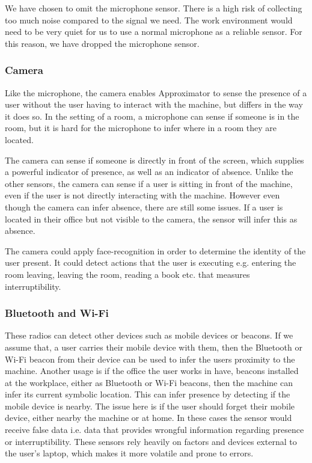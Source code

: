 \documentclass{sigchi}
\begin{document}
We have chosen to omit the microphone sensor.
There is a high risk of collecting too much noise compared to the signal we need.
The work environment would need to be very quiet for us to use a normal microphone as a reliable sensor.
For this reason, we have dropped the microphone sensor.

\subsubsection{Camera}
Like the microphone, the camera enables Approximator to sense the presence of a user without the user having to interact with the machine, but differs in the way it does so.
In the setting of a room, a microphone can sense if someone is in the room, but it is hard for the microphone to infer where in a room they are located.

The camera can sense if someone is directly in front of the screen, which supplies a powerful indicator of presence, as well as an indicator of absence.
Unlike the other sensors, the camera can sense if a user is sitting in front of the machine, even if the user is not directly interacting with the machine.
However even though the camera can infer absence, there are still some issues.
If a user is located in their office but not visible to the camera, the sensor will infer this as absence.

The camera could apply face-recognition in order to determine the identity of the user present.
It could detect actions that the user is executing e.g. entering the room leaving, leaving the room, reading a book etc. that measures interruptibility.

\subsubsection{Bluetooth and Wi-Fi}
These radios can detect other devices such as mobile devices or beacons.
If we assume that, a user carries their mobile device with them, then the Bluetooth or Wi-Fi beacon from their device can be used to infer the users proximity to the machine.
Another usage is if the office the user works in have, beacons installed at the workplace, either as Bluetooth or Wi-Fi beacons, then the machine can infer its current symbolic location.
This can infer presence by detecting if the mobile device is nearby.
The issue here is if the user should forget their mobile device, either nearby the machine or at home.
In these cases the sensor would receive false data i.e. data that provides wrongful information regarding presence or interruptibility.
These sensors rely heavily on factors and devices external to the user's laptop, which makes it more volatile and prone to errors.
\end{document}
